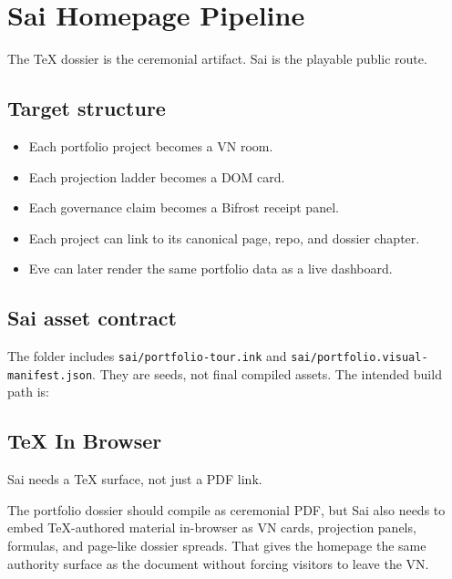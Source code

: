 \chapter{Sai Homepage Pipeline}

The TeX dossier is the ceremonial artifact. Sai is the playable public route.

\section{Target structure}

\begin{itemize}
  \item Each portfolio project becomes a VN room.
  \item Each projection ladder becomes a DOM card.
  \item Each governance claim becomes a Bifrost receipt panel.
  \item Each project can link to its canonical page, repo, and dossier chapter.
  \item Eve can later render the same portfolio data as a live dashboard.
\end{itemize}

\section{Sai asset contract}

The folder includes \texttt{sai/portfolio-tour.ink} and \texttt{sai/portfolio.visual-manifest.json}. They are seeds, not final compiled assets. The intended build path is:

\begin{center}
\end{center}


\section{TeX In Browser}

Sai needs a TeX surface, not just a PDF link.

The portfolio dossier should compile as ceremonial PDF, but Sai also needs to embed TeX-authored material in-browser as VN cards, projection panels, formulas, and page-like dossier spreads. That gives the homepage the same authority surface as the document without forcing visitors to leave the VN.

